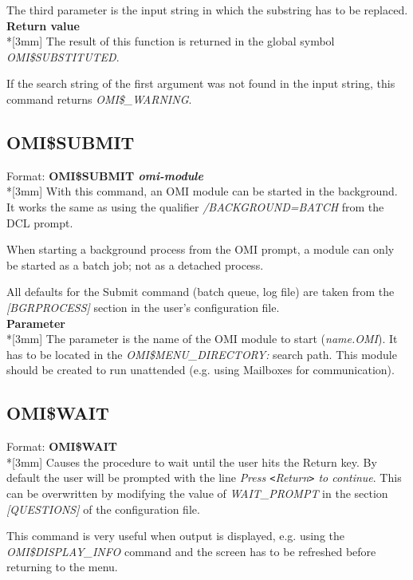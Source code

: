 \documentclass[a4paper]{book}
\newcommand{\lt}{\texttt{<}}
\newcommand{\gt}{\texttt{>}}
\renewcommand{\indent}{\hspace*{5mm}}
\begin{document}
The third parameter is the input string in which the substring has to be 
replaced.\\[3mm]
\textbf{Return value}\\*[3mm]
The result of this function is returned in the global symbol 
\textsl{OMI{\$}SUBSTITUTED}.

If the search string of the first argument was not found in the input 
string, this command returns \textsl{OMI{\$}{\_}WARNING}.

\subsection{OMI{\$}SUBMIT}
\label{subsubsec:mylabel63}

\indent Format: \textbf{OMI{\$}SUBMIT \textit{omi-module}}\\*[3mm]
With this command, an OMI module can be started in the background. It works 
the same as using the qualifier \textsl{/BACKGROUND=BATCH} from the DCL 
prompt.

When starting a background process from the OMI prompt, a module can only be 
started as a batch job; not as a detached process. 

All defaults for the Submit command (batch queue, log file) are taken from 
the \textsl{[BGRPROCESS]} section in the user's configuration file.\\[3mm]
\textbf{Parameter}\\*[3mm]
The parameter is the name of the OMI module to start (\textsl{\textit{name}.OMI}). It has to be 
located in the \textsl{OMI{\$}MENU{\_}DIRECTORY:} search path. This module should be 
created to run unattended (e.g. using Mailboxes for communication).

\subsection{OMI{\$}WAIT}
\label{subsubsec:mylabel64}

\indent Format: \textbf{OMI{\$}WAIT}\\*[3mm]
Causes the procedure to wait until the user hits the Return key. By default 
the user will be prompted with the line \textsl{Press \lt Return\gt{} to continue}. This can be overwritten by 
modifying the value of \textsl{WAIT{\_}PROMPT} in the section \textsl{[QUESTIONS]} of the 
configuration file.

This command is very useful when output is displayed, e.g. using the 
\textsl{OMI{\$}DISPLAY{\_}INFO} 
command and the screen has to be refreshed before returning to the menu.
\end{document}
